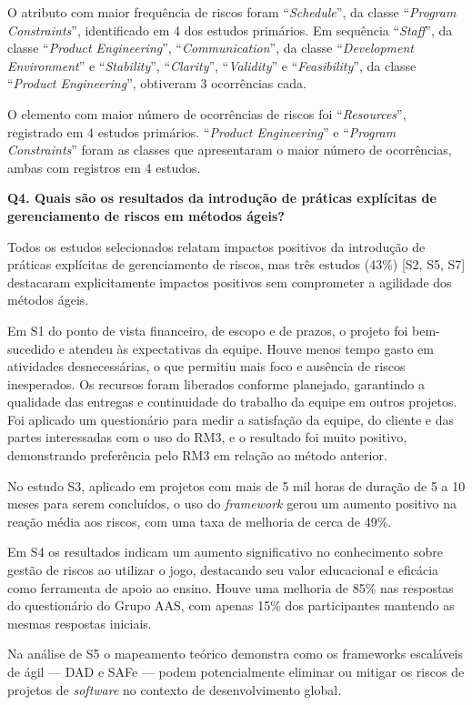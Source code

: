 \documentclass[
	12pt,
	openright,
	twoside,
	a4paper,
	english,
	brazil
	]{abntex2}
\begin{document}
O atributo com maior frequência de riscos foram “\textit{Schedule}”, da classe “\textit{Program Constraints}”, identificado em 4 dos estudos primários. Em sequência “\textit{Staff}”, da classe “\textit{Product Engineering}”, “\textit{Communication}”, da classe “\textit{Development Environment}” e “\textit{Stability}”, “\textit{Clarity}”, “\textit{Validity}” e “\textit{Feasibility}”, da classe “\textit{Product Engineering}”, obtiveram 3 ocorrências cada.

O elemento com maior número de ocorrências de riscos foi “\textit{Resources}”, registrado em 4 estudos primários. “\textit{Product Engineering}” e “\textit{Program Constraints}” foram as classes que apresentaram o maior número de ocorrências, ambas com registros em 4 estudos.

\textbf{Q4. Quais são os resultados da introdução de práticas explícitas de gerenciamento de riscos em métodos ágeis?}

Todos os estudos selecionados relatam impactos positivos da introdução de práticas explícitas de gerenciamento de riscos, mas três estudos (43\%) [S2, S5, S7] destacaram explicitamente impactos positivos sem comprometer a agilidade dos métodos ágeis.

Em S1 do ponto de vista financeiro, de escopo e de prazos, o projeto foi bem-sucedido e atendeu às expectativas da equipe. Houve menos tempo gasto em atividades desnecessárias, o que permitiu mais foco e ausência de riscos inesperados. Os recursos foram liberados conforme planejado, garantindo a qualidade das entregas e continuidade do trabalho da equipe em outros projetos. Foi aplicado um questionário para medir a satisfação da equipe, do cliente e das partes interessadas com o uso do RM3, e o resultado foi muito positivo, demonstrando preferência pelo RM3 em relação ao método anterior.

No estudo S3, aplicado em projetos com mais de 5 mil horas de duração de 5 a 10 meses para serem concluídos, o uso do \textit{framework} gerou um aumento positivo na reação média aos riscos, com uma taxa de melhoria de cerca de 49\%.

Em S4 os resultados indicam um aumento significativo no conhecimento sobre gestão de riscos ao utilizar o jogo, destacando seu valor educacional e eficácia como ferramenta de apoio ao ensino. Houve uma melhoria de 85\% nas respostas do questionário do Grupo AAS, com apenas 15\% dos participantes mantendo as mesmas respostas iniciais.

Na análise de S5 o mapeamento teórico demonstra como os frameworks escaláveis de ágil — DAD e SAFe — podem potencialmente eliminar ou mitigar os riscos de projetos de \textit{software} no contexto de desenvolvimento global.
\end{document}
